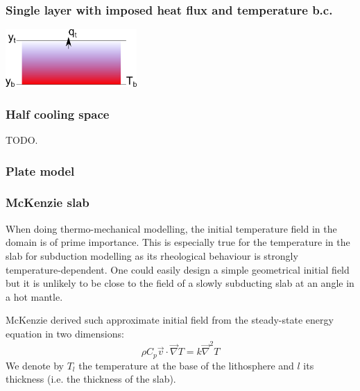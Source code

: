 

 
\subsubsection{Single layer with imposed heat flux and temperature b.c. }

\begin{center}
\includegraphics[width=5cm]{images/initial_temperature/tempcond3.png}
\end{center}



\subsubsection{Half cooling space}

TODO. 

\Literature \cite{fagm12} 

\subsubsection{Plate model}

\subsubsection{McKenzie slab}

When doing thermo-mechanical modelling, the initial temperature
field in the domain is of prime importance. This is 
especially true for the temperature in the slab for subduction 
modelling as its rheological behaviour is strongly temperature-dependent. 
One could easily design a simple geometrical initial field but it is 
unlikely to be close to the field of a slowly subducting slab at an angle 
in a hot mantle. 

McKenzie \cite{mcke69} derived such approximate initial field from the 
steady-state energy equation in two dimensions:
\[
\rho C_p \vec v \cdot \vec\nabla T = k \vec\nabla^2 T
\]
We denote by $T_l$ the temperature at the base of the lithosphere
and $l$ its thickness (i.e. the thickness of the slab).

